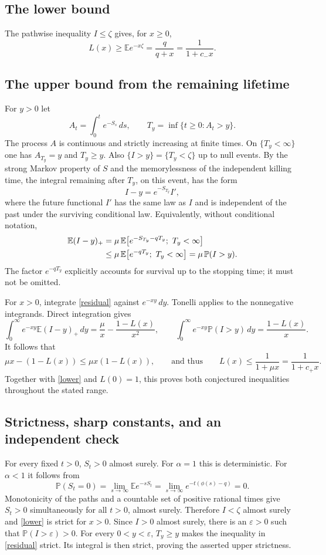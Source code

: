 \documentclass[11pt]{article}
\newcommand{\EE}{\mathbb E}
\newcommand{\PP}{\mathbb P}
\begin{document}
\subsection*{The lower bound}
The pathwise inequality $I\leq\zeta$ gives, for $x\geq0$,
\begin{equation}\label{lower}
 L(x)\geq\EE e^{-x\zeta}=\frac{q}{q+x}
                         =\frac1{1+c_-x}.
\end{equation}

\subsection*{The upper bound from the remaining lifetime}
For $y>0$ let
\[
 A_t=\int_0^t e^{-S_s}\,ds,\qquad
 T_y=\inf\{t\geq0:A_t>y\}.
\]
The process $A$ is continuous and strictly increasing at finite
times. On $\{T_y<\infty\}$ one has $A_{T_y}=y$ and $T_y\geq y$.
Also $\{I>y\}=\{T_y<\zeta\}$ up to null events.
By the strong Markov property of $S$ and the memorylessness of the
independent killing time, the integral remaining after $T_y$, on
this event, has the form
\[
 I-y=e^{-S_{T_y}}I',
\]
where the future functional $I'$ has the same law as $I$ and is
independent of the past under the surviving conditional law.
Equivalently, without conditional notation,
\begin{align}
 \EE(I-y)_+
   &=\mu\,\EE\!\left[e^{-S_{T_y}-qT_y};\ T_y<\infty\right]
       \notag\\
   &\leq\mu\,\EE\!\left[e^{-qT_y};\ T_y<\infty\right]
    =\mu\,\PP(I>y).\label{residual}
\end{align}
The factor $e^{-qT_y}$ explicitly accounts for survival up to the
stopping time; it must not be omitted.

For $x>0$, integrate \eqref{residual} against $e^{-xy}\,dy$.
Tonelli applies to the nonnegative integrands. Direct integration
gives
\[
 \int_0^\infty e^{-xy}\EE(I-y)_+\,dy
       =\frac{\mu}{x}-\frac{1-L(x)}{x^2},\qquad
 \int_0^\infty e^{-xy}\PP(I>y)\,dy=\frac{1-L(x)}x.
\]
It follows that
\[
 \mu x-(1-L(x))\leq\mu x(1-L(x)),
 \qquad\text{and thus}\qquad
 L(x)\leq\frac1{1+\mu x}=\frac1{1+c_+x}.
\]
Together with \eqref{lower} and $L(0)=1$, this proves both conjectured
inequalities throughout the stated range.

\subsection*{Strictness, sharp constants, and an independent check}
For every fixed $t>0$, $S_t>0$ almost surely. For $\alpha=1$ this is
deterministic. For $\alpha<1$ it follows from
\[
 \PP(S_t=0)=\lim_{s\to\infty}\EE e^{-sS_t}
          =\lim_{s\to\infty}e^{-t(\phi(s)-q)}=0.
\]
Monotonicity of the paths and a countable set of positive rational
times give $S_t>0$ simultaneously for all $t>0$, almost surely.
Therefore $I<\zeta$ almost surely and \eqref{lower} is strict for
$x>0$. Since $I>0$ almost surely, there is an $\varepsilon>0$ such
that $\PP(I>\varepsilon)>0$. For every $0<y<\varepsilon$,
$T_y\geq y$ makes the inequality in \eqref{residual} strict.
Its integral is then strict, proving the asserted upper strictness.
\end{document}

